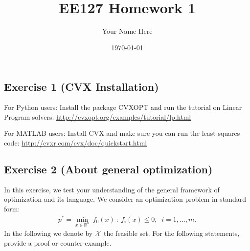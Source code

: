 \documentclass[11pt]{article}
\begin{document}
\title{EE127 Homework 1}
\author{Your Name Here}
\date{\today}
\maketitle

\subsection*{Exercise 1 (CVX Installation)} 

For Python users:
Install the package CVXOPT and run the tutorial on Linear Program solvers: \url{http://cvxopt.org/examples/tutorial/lp.html}

For MATLAB users: Install CVX and make sure you can run the least squares code: \url{http://cvxr.com/cvx/doc/quickstart.html}

\begin{solution}
\end{solution}

\newpage
\subsection*{Exercise 2 (About general optimization)}

In this exercise, we test your understanding of the general framework of optimization and its language. We consider an optimization problem in standard form: 
\begin{align*}
    p^* = \min_{x \in \mathbb{R}^n} \: f_0(x) ~:~ f_i(x) \le 0, \;\; i=1,\ldots,m.
\end{align*}
In the following we denote by ${\cal X}$ the feasible set. For the following statements, provide a proof or counter-example.
\end{document}

